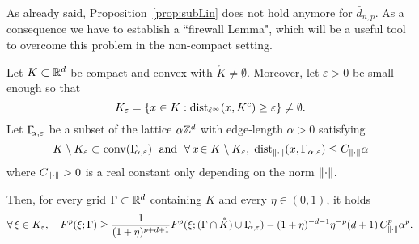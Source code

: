 % 
% 
% 
% 

As already said, Proposition~\ref{prop:subLin} does not hold anymore for $\bar
d_{n,p}$. As a consequence we have to establish a 
``firewall Lemma",
which will be a useful tool to overcome this problem  in the
non-compact setting.

\begin{lemma}[Firewall]\label{lem:firewall} Let $K \subset \mathbb{R}^d$ be compact and convex with $\mathring K \neq \emptyset$.
Moreover, let $\varepsilon > 0$ be small enough so that 
\[
	K_\varepsilon = \{ x\in K : \operatorname{dist}_{\ell^{\infty}}(x, K^c) \geq \varepsilon \} \neq \emptyset.
\]
Let $\Gamma_{\!\!\alpha, \varepsilon}$ be a subset of the lattice $\alpha \mathbb{Z}^d$ with edge-length $\alpha > 0$
satisfying
\[
 K \setminus K_\varepsilon \subset \operatorname{conv}(\Gamma_{\!\!\alpha, \varepsilon})\;\mbox{ and }\; \forall\, x\!\in K\setminus K_{\varepsilon},\;{\rm
dist}_{\lVert\cdot\rVert}(x,\Gamma_{\alpha,\varepsilon})\le C_{\lVert\cdot\rVert}\alpha
\] 
where $C_{\lVert\cdot\rVert} > 0$ is  a real  constant   only  depending on the norm $\lVert\cdot\rVert$.

Then, for every grid $\Gamma\subset \mathbb{R}^d$ containing $K$ and every $\eta \in (0,1)$, it holds
\[
\forall\, \xi \in
K_\varepsilon,\quad 	F^p(\xi; \Gamma) \geq \frac{1}{(1+\eta)^{p+d+1}} F^p(\xi; (\Gamma \cap \mathring K)
	\cup \Gamma_{\!\!\alpha, \varepsilon} )   - (1+\eta)^{-d-1}\eta^{-p} 
	(d+1)\, C^p_{\lVert\cdot\rVert}  \alpha^p.
\]
\end{lemma}

